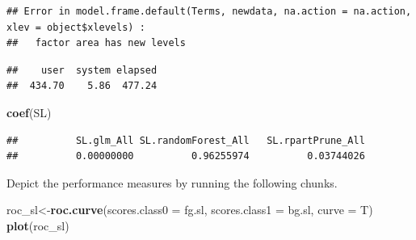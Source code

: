 \documentclass[]{article}
\newenvironment{Shaded}{\begin{snugshade}}{\end{snugshade}}
\newcommand{\CommentTok}[1]{\textcolor[rgb]{0.56,0.35,0.01}{\textit{#1}}}
\newcommand{\DataTypeTok}[1]{\textcolor[rgb]{0.13,0.29,0.53}{#1}}
\newcommand{\DecValTok}[1]{\textcolor[rgb]{0.00,0.00,0.81}{#1}}
\newcommand{\KeywordTok}[1]{\textcolor[rgb]{0.13,0.29,0.53}{\textbf{#1}}}
\newcommand{\NormalTok}[1]{#1}
\newcommand{\OperatorTok}[1]{\textcolor[rgb]{0.81,0.36,0.00}{\textbf{#1}}}
\newcommand{\OtherTok}[1]{\textcolor[rgb]{0.56,0.35,0.01}{#1}}
\newcommand{\StringTok}[1]{\textcolor[rgb]{0.31,0.60,0.02}{#1}}
\begin{document}
\begin{verbatim}
## Error in model.frame.default(Terms, newdata, na.action = na.action, xlev = object$xlevels) : 
##   factor area has new levels
\end{verbatim}

\begin{verbatim}
##    user  system elapsed 
##  434.70    5.86  477.24
\end{verbatim}

\begin{Shaded}
\begin{Highlighting}[]
\KeywordTok{coef}\NormalTok{(SL)}
\end{Highlighting}
\end{Shaded}

\begin{verbatim}
##          SL.glm_All SL.randomForest_All   SL.rpartPrune_All 
##          0.00000000          0.96255974          0.03744026
\end{verbatim}

Depict the performance measures by running the following chunks.

\begin{Shaded}
\end{Shaded}

\begin{Shaded}
\end{Shaded}

\begin{Shaded}
\begin{Highlighting}[]
\NormalTok{roc_sl<-}\KeywordTok{roc.curve}\NormalTok{(}\DataTypeTok{scores.class0 =}\NormalTok{ fg.sl,}
                  \DataTypeTok{scores.class1 =}\NormalTok{ bg.sl,}
                  \DataTypeTok{curve =}\NormalTok{ T)}
\KeywordTok{plot}\NormalTok{(roc_sl) }
\end{Highlighting}
\end{Shaded}
\end{document}
